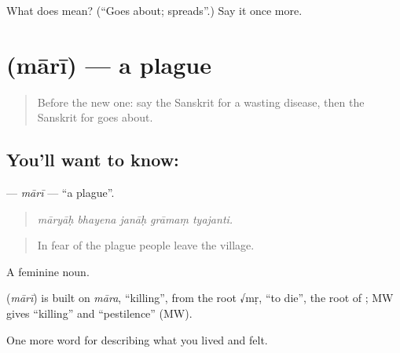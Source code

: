 \begin{tcolorbox}[breakable,colback=teal!4,colframe=teal!35!black,title={Before you move on}]
What does  mean? (\textquotedblleft{}Goes about; spreads\textquotedblright{}.) Say it once more.
\end{tcolorbox}
\section[\texorpdfstring{\sk{मारी} (mārī)}{मारी (mārī)}]{ (mārī) — a plague}

\label{lesson:SA-C479-mari}



\begin{quote}
Before the new one: say the Sanskrit for a wasting disease, then the Sanskrit for goes about.
\end{quote}

\subsection*{You'll want to know: }
\textbf{} — \emph{mārī} — \textquotedblleft{}a plague\textquotedblright{}.

\begin{quote}
    
\end{quote}

\begin{quote}
\emph{māryāḥ bhayena janāḥ grāmaṃ tyajanti.}
\end{quote}

\begin{quote}
In fear of the plague people leave the village.
\end{quote}

A feminine noun.

\begin{cousinweb}
\textbf{} (\emph{mārī}) is built on \emph{māra}, \textquotedblleft{}killing\textquotedblright{}, from the root √mṛ, \textquotedblleft{}to die\textquotedblright{}, the root of \textbf{}; MW gives \textquotedblleft{}killing\textquotedblright{} and \textquotedblleft{}pestilence\textquotedblright{} (MW).
\end{cousinweb}

\begin{grammarlens}[title={What you've built}]
One more word for describing what you lived and felt.
\end{grammarlens}

